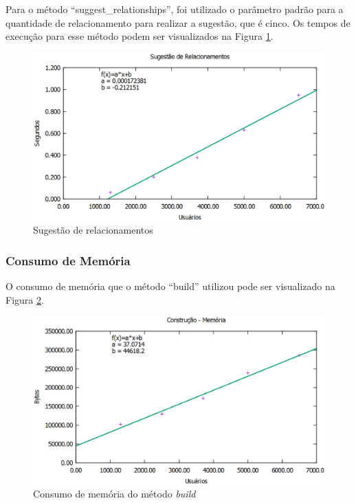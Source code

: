 Para o método ``suggest\_relationships'', foi utilizado o parâmetro padrão para a quantidade de relacionamento para realizar a sugestão, que é cinco. Os tempos de execução para esse método podem ser visualizados na Figura \ref{suggest}.

\begin{figure}[!h]
	\centering
	\includegraphics[scale=0.55]{figuras/resultados/graficos/sugestao_relacionamentos.eps}
	\caption[Sugestão de relacionamentos]{Sugestão de relacionamentos}
	\label{suggest}
\end{figure}

\subsubsection{Consumo de Memória}

O consumo de memória que o método ``build'' utilizou pode ser visualizado na Figura \ref{build_memoria}.

\begin{figure}[!h]
	\centering
	\includegraphics[scale=0.55]{figuras/resultados/graficos/construcao_memoria.eps}
	\caption[Consumo de memória do método build]{Consumo de memória do método \textit{build}}
	\label{build_memoria}
\end{figure}

